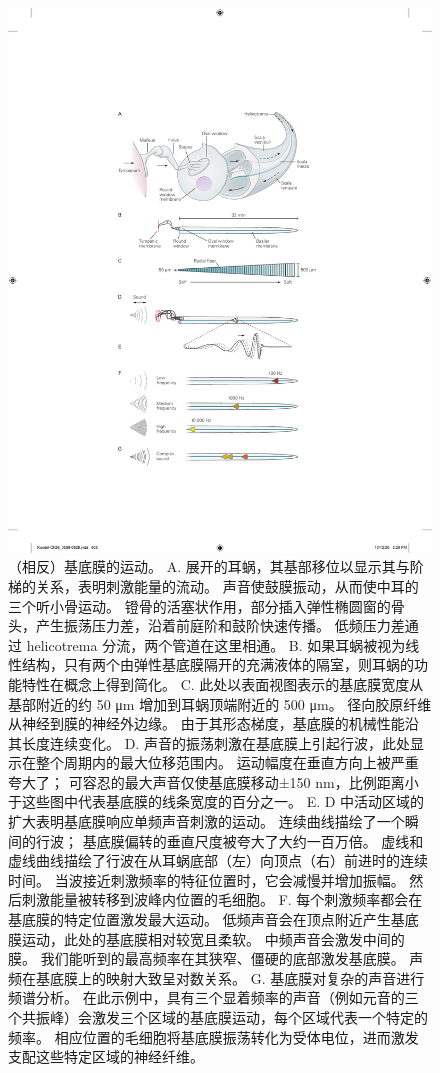 \begin{figure}[htbp]
	\centering
	\includegraphics[width=0.5\linewidth]{chap26/fig_26_3}
	\caption{（相反）基底膜的运动。 
		A. 展开的耳蜗，其基部移位以显示其与阶梯的关系，表明刺激能量的流动。 
		声音使鼓膜振动，从而使中耳的三个听小骨运动。 
		镫骨的活塞状作用，部分插入弹性椭圆窗的骨头，产生振荡压力差，沿着前庭阶和鼓阶快速传播。 低频压力差通过 helicotrema 分流，两个管道在这里相通。 
		B. 如果耳蜗被视为线性结构，只有两个由弹性基底膜隔开的充满液体的隔室，则耳蜗的功能特性在概念上得到简化。 
		C. 此处以表面视图表示的基底膜宽度从基部附近的约 50 μm 增加到耳蜗顶端附近的 500 μm。 
		径向胶原纤维从神经到膜的神经外边缘。 由于其形态梯度，基底膜的机械性能沿其长度连续变化。 
		D. 声音的振荡刺激在基底膜上引起行波，此处显示在整个周期内的最大位移范围内。 
		运动幅度在垂直方向上被严重夸大了； 可容忍的最大声音仅使基底膜移动±150 nm，比例距离小于这些图中代表基底膜的线条宽度的百分之一。
		E. D 中活动区域的扩大表明基底膜响应单频声音刺激的运动。 连续曲线描绘了一个瞬间的行波； 基底膜偏转的垂直尺度被夸大了大约一百万倍。 虚线和虚线曲线描绘了行波在从耳蜗底部（左）向顶点（右）前进时的连续时间。 当波接近刺激频率的特征位置时，它会减慢并增加振幅。 然后刺激能量被转移到波峰内位置的毛细胞。 
		F. 每个刺激频率都会在基底膜的特定位置激发最大运动。 低频声音会在顶点附近产生基底膜运动，此处的基底膜相对较宽且柔软。 中频声音会激发中间的膜。 我们能听到的最高频率在其狭窄、僵硬的底部激发基底膜。 声频在基底膜上的映射大致呈对数关系。 
		G. 基底膜对复杂的声音进行频谱分析。 在此示例中，具有三个显着频率的声音（例如元音的三个共振峰）会激发三个区域的基底膜运动，每个区域代表一个特定的频率。 相应位置的毛细胞将基底膜振荡转化为受体电位，进而激发支配这些特定区域的神经纤维。}
	\label{fig:26_3}
\end{figure}


